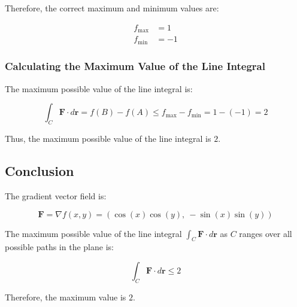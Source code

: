 \documentclass[11pt]{article}
\begin{document}
Therefore, the correct maximum and minimum values are:

\[
\begin{aligned}
f_{\text{max}} &= 1 \\
f_{\text{min}} &= -1
\end{aligned}
\]

\newpage

\subsubsection{Calculating the Maximum Value of the Line Integral}

The maximum possible value of the line integral is:

\[
\int_{C} \mathbf{F} \cdot d\mathbf{r} = f(B) - f(A) \leq f_{\text{max}} - f_{\text{min}} = 1 - (-1) = 2
\]

Thus, the maximum possible value of the line integral is \( \boxed{2} \).

\newpage

\subsection{Conclusion}

The gradient vector field is:

\[
\mathbf{F} = \nabla f(x, y) = \left( \cos(x) \cos(y),\ -\sin(x) \sin(y) \right)
\]

The maximum possible value of the line integral \( \displaystyle \int_{C} \mathbf{F} \cdot d\mathbf{r} \) as \( C \) ranges over all possible paths in the plane is:

\[
\int_{C} \mathbf{F} \cdot d\mathbf{r} \leq 2
\]

Therefore, the maximum value is \( \boxed{2} \).
\end{document}
